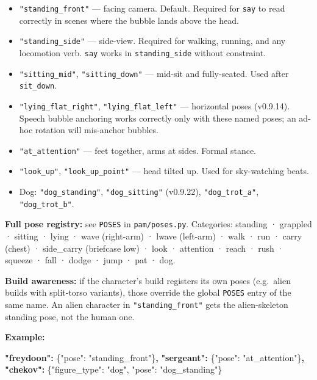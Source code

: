 \documentclass[
  11pt,
]{book}
\newenvironment{Shaded}{}{}
\newcommand{\DataTypeTok}[1]{\textcolor[rgb]{0.56,0.13,0.00}{#1}}
\newcommand{\ErrorTok}[1]{\textcolor[rgb]{1.00,0.00,0.00}{\textbf{#1}}}
\newcommand{\FunctionTok}[1]{\textcolor[rgb]{0.02,0.16,0.49}{#1}}
\newcommand{\StringTok}[1]{\textcolor[rgb]{0.25,0.44,0.63}{#1}}
\providecommand{\tightlist}{%
  \setlength{\itemsep}{0pt}\setlength{\parskip}{0pt}}
\begin{document}
\begin{itemize}
\tightlist
\item
  \texttt{"standing\_front"} --- facing camera. Default. Required for
  \texttt{say} to read correctly in scenes where the bubble lands above
  the head.
\item
  \texttt{"standing\_side"} --- side-view. Required for walking,
  running, and any locomotion verb. \texttt{say} works in
  \texttt{standing\_side} without constraint.
\item
  \texttt{"sitting\_mid"}, \texttt{"sitting\_down"} --- mid-sit and
  fully-seated. Used after \texttt{sit\_down}.
\item
  \texttt{"lying\_flat\_right"}, \texttt{"lying\_flat\_left"} ---
  horizontal poses (v0.9.14). Speech bubble anchoring works correctly
  only with these named poses; an ad-hoc rotation will mis-anchor
  bubbles.
\item
  \texttt{"at\_attention"} --- feet together, arms at sides. Formal
  stance.
\item
  \texttt{"look\_up"}, \texttt{"look\_up\_point"} --- head tilted up.
  Used for sky-watching beats.
\item
  Dog: \texttt{"dog\_standing"}, \texttt{"dog\_sitting"} (v0.9.22),
  \texttt{"dog\_trot\_a"}, \texttt{"dog\_trot\_b"}.
\end{itemize}

\textbf{Full pose registry:} see \texttt{POSES} in
\texttt{pam/poses.py}. Categories: standing · grappled · sitting · lying
· wave (right-arm) · lwave (left-arm) · walk · run · carry (chest) ·
side\_carry (briefcase low) · look · attention · reach · rush · squeeze
· fall · dodge · jump · pat · dog.

\textbf{Build awareness:} if the character's build registers its own
poses (e.g.~alien builds with split-torso variants), those override the
global \texttt{POSES} entry of the same name. An alien character in
\texttt{"standing\_front"} gets the alien-skeleton standing pose, not
the human one.

\textbf{Example:}

\begin{Shaded}
\begin{Highlighting}[]
\ErrorTok{"freydoon":} \FunctionTok{\{}\DataTypeTok{"pose"}\FunctionTok{:} \StringTok{"standing\_front"}\FunctionTok{\}}\ErrorTok{,}
\ErrorTok{"sergeant":} \FunctionTok{\{}\DataTypeTok{"pose"}\FunctionTok{:} \StringTok{"at\_attention"}\FunctionTok{\}}\ErrorTok{,}
\ErrorTok{"chekov":}   \FunctionTok{\{}\DataTypeTok{"figure\_type"}\FunctionTok{:} \StringTok{"dog"}\FunctionTok{,} \DataTypeTok{"pose"}\FunctionTok{:} \StringTok{"dog\_standing"}\FunctionTok{\}}
\end{Highlighting}
\end{Shaded}
\end{document}
